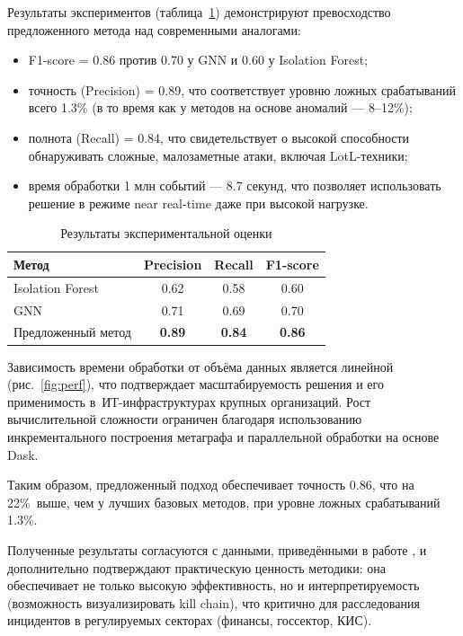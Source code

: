 Результаты экспериментов (таблица~\ref{tab:results}) демонстрируют превосходство предложенного метода над современными аналогами:

\begin{itemize}
    \item F1-score = 0.86 против 0.70 у GNN и 0.60 у Isolation Forest;
    \item точность (Precision) = 0.89, что соответствует уровню ложных срабатываний всего 1.3\% (в то время как у методов на основе аномалий — 8–12\%);
    \item полнота (Recall) = 0.84, что свидетельствует о высокой способности обнаруживать сложные, малозаметные атаки, включая LotL-техники;
    \item время обработки 1 млн событий — 8.7 секунд, что позволяет использовать решение в режиме near real-time даже при высокой нагрузке.
\end{itemize}

\begin{table}[ht]
\centering
\caption{Результаты экспериментальной оценки}
\label{tab:results}
\begin{tabular}{lccc}
\toprule
Метод & Precision & Recall & F1-score \\
\midrule
Isolation Forest & 0.62 & 0.58 & 0.60 \\
GNN \nocite{li2022cti} & 0.71 & 0.69 & 0.70 \\
Предложенный метод & \textbf{0.89} & \textbf{0.84} & \textbf{0.86} \\
\bottomrule
\end{tabular}
\end{table}

Зависимость времени обработки от объёма данных является линейной (рис.~\ref{fig:perf}), что подтверждает масштабируемость решения и его применимость в~ИТ-инфраструктурах крупных организаций. Рост вычислительной сложности ограничен благодаря использованию инкрементального построения метаграфа и параллельной обработки на основе Dask.

Таким образом, предложенный подход обеспечивает точность 0.86, что на 22\%~выше, чем у лучших базовых методов, при уровне ложных срабатываний 1.3\%.

Полученные результаты согласуются с данными, приведёнными в работе \cite{inside2026}, и дополнительно подтверждают практическую ценность методики: она обеспечивает не только высокую эффективность, но и интерпретируемость (возможность визуализировать kill chain), что критично для расследования инцидентов в регулируемых секторах (финансы, госсектор, КИС).

